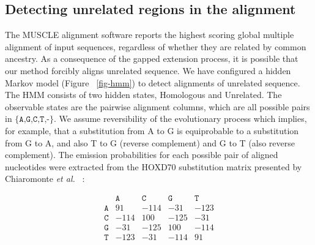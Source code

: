 \documentclass[12pt,journal,draftcls,letterpaper,onecolumn]{IEEEtran}
\begin{document}
\subsection{Detecting unrelated regions in the alignment}
\begin{figure*}[t!]
\centering {}
\caption[Hidden Markov model used to detect pairwise alignments of unrelated
sequence]%
{\textbf{Hidden Markov model used to detect pairwise alignments of unrelated
sequence.} The HMM has states which model alignment columns containing
homologous and unrelated sequence. Emission probabilities are extracted from the HOXD70 substitution matrix and correspond to alignment
columns, for example \texttt{AA} indicates A aligned to A.  gO
indicates gap-open and gE gap extend. Alignment columns are treated as
strand-symmetric, so that AC also indicates CA and the reverse
complements TG and GT.  The emission probabilities are adjusted to the G+C content of the input genome
as described in the text.  The values shown here correspond to a 47.5\% G+C genome.}
\label{fig-hmm}
\end{figure*}
The MUSCLE alignment software reports the highest scoring
global multiple alignment of input sequences, regardless of whether
they are related by common ancestry. As a consequence of the gapped
extension process, it is possible that our method forcibly aligns unrelated
sequence. We have configured a hidden Markov model (Figure
~\ref{fig-hmm}) to detect alignments of unrelated sequence. The HMM
consists of two hidden states, Homologous and Unrelated. The
observable states are the pairwise alignment columns, which are all
possible pairs in $\texttt{{\{A,G,C,T,-\}}}$.  We assume reversibility of the
evolutionary process which implies, for example, that a substitution from A to G is equiprobable to a substitution from G to A, and also T to G (reverse complement) and G to T (also reverse complement).   The emission probabilities for
each possible pair of aligned nucleotides were extracted from the HOXD70
substitution matrix presented by Chiaromonte \textit{et al.}~\cite{hoxd} :
\large
\begin{center}
\begin{equation}
\begin{array}{crrrr}
  & \texttt{A} & \texttt{C} & \texttt{G} & \texttt{T} \\
\texttt{A} & 91 & -114 & -31 & -123 \\
\texttt{C} & -114 & 100 & -125 & -31 \\
\texttt{G} & -31 & -125 & 100 & -114 \\
\texttt{T} & -123 & -31 & -114 & 91 \\ \end{array}
\end{equation}
\end{center}
\end{document}
